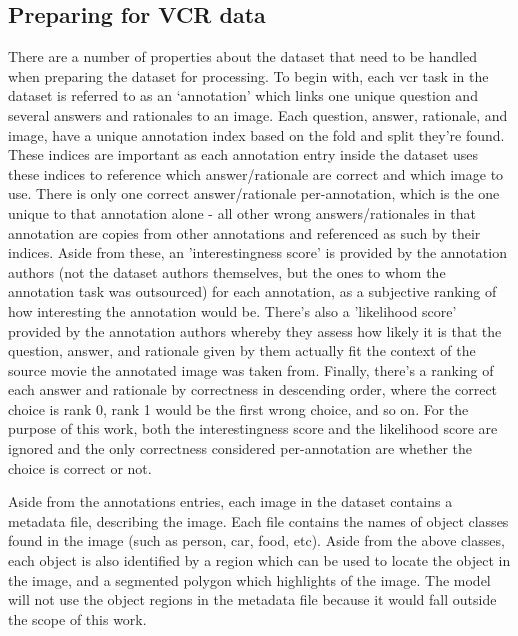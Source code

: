 \subsection{Preparing for VCR data}
\label{subsec:preparing_the_vcr_data}

There are a number of properties about the dataset that need to be handled when preparing the dataset for processing.
To begin with, each \gls{vcr} task in the dataset is referred to as an `annotation' which links one unique question and several answers and rationales to an image.
Each question, answer, rationale, and image, have a unique annotation index based on the fold and split they're found.
These indices are important as each annotation entry inside the dataset uses these indices to reference which answer/rationale are correct and which image to use.
There is only one correct answer/rationale per-annotation, which is the one unique to that annotation alone - all other wrong answers/rationales in that annotation are copies from other annotations and referenced as such by their indices.
Aside from these, an 'interestingness score' is provided by the annotation authors (not the dataset authors themselves, but the ones to whom the annotation task was outsourced) for each annotation, as a subjective ranking of how interesting the annotation would be.
There's also a 'likelihood score' provided by the annotation authors whereby they assess how likely it is that the question, answer, and rationale given by them actually fit the context of the source movie the annotated image was taken from.
Finally, there's a ranking of each answer and rationale by correctness in descending order, where the correct choice is rank 0, rank 1 would be the first wrong choice, and so on.
For the purpose of this work, both the interestingness score and the likelihood score are ignored and the only correctness considered per-annotation are whether the choice is correct or not.

Aside from the annotations entries, each image in the dataset contains a metadata file, describing the image.
Each file contains the names of object classes found in the image (such as person, car, food, etc).
Aside from the above classes, each object is also identified by a region which can be used to locate the object in the image, and a segmented polygon which highlights of the image.
The model will not use the object regions in the metadata file because it would fall outside the scope of this work.

